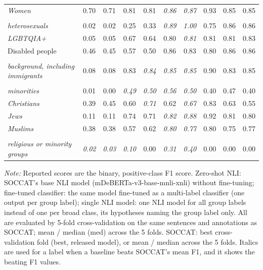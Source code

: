 \begin{table}[htb]
\begin{threeparttable}
\begin{tabular}{l c c c c c c c c c}
\textit{Women} & 0.70 & 0.71 & 0.81 & 0.81 & \textit{0.86} & \textit{0.87} & 0.93 & 0.85 & 0.85 \\
\shortstack[l]{\textit{Cisgender and}\\[-3pt]\textit{heterosexuals}} & 0.02 & 0.02 & 0.25 & 0.33 & \textit{0.89} & \textit{1.00} & 0.75 & 0.86 & 0.86 \\
\textit{LGBTQIA+} & 0.05 & 0.05 & 0.67 & 0.64 & 0.80 & \textit{0.81} & 0.81 & 0.81 & 0.83 \\
Disabled people & 0.46 & 0.45 & 0.57 & 0.50 & 0.86 & 0.83 & 0.80 & 0.86 & 0.86 \\
\shortstack[l]{\textit{People with an immigration}\\[-3pt]\textit{background, including immigrants}} & 0.08 & 0.08 & 0.83 & \textit{0.84} & \textit{0.85} & \textit{0.85} & 0.90 & 0.83 & 0.85 \\
\shortstack[l]{\textit{Ethnic and racial}\\[-3pt]\textit{minorities}} & 0.01 & 0.00 & \textit{0.49} & \textit{0.50} & \textit{0.56} & \textit{0.50} & 0.40 & 0.47 & 0.40 \\
\textit{Christians} & 0.39 & 0.45 & 0.60 & \textit{0.71} & 0.62 & \textit{0.67} & 0.83 & 0.63 & 0.55 \\
\textit{Jews} & 0.11 & 0.11 & 0.74 & 0.71 & \textit{0.82} & \textit{0.88} & 0.92 & 0.81 & 0.80 \\
\textit{Muslims} & 0.38 & 0.38 & 0.57 & 0.62 & \textit{0.80} & \textit{0.77} & 0.80 & 0.75 & 0.77 \\
\shortstack[l]{\textit{Multiple (or other)}\\[-3pt]\textit{religious or minority groups}} & \textit{0.02} & \textit{0.03} & \textit{0.10} & 0.00 & \textit{0.31} & \textit{0.40} & 0.00 & 0.00 & 0.00 \\
\bottomrule
\end{tabular}
\begin{tablenotes}[flushleft]
\footnotesize
\item \textit{Note:} Reported scores are the binary, positive-class F1 score. Zero-shot NLI: SOCCAT's base NLI model (mDeBERTa-v3-base-mnli-xnli) without fine-tuning; fine-tuned classifier: the same model fine-tuned as a multi-label classifier (one output per group label); single NLI model: one NLI model for all group labels instead of one per broad class, its hypotheses naming the group label only. All are evaluated by 5-fold cross-validation on the same sentences and annotations as SOCCAT; mean / median (med) across the 5 folds. SOCCAT: best cross-validation fold (best, released model), or mean / median across the 5 folds. Italics are used for a label when a baseline beats SOCCAT's mean F1, and it shows the beating F1 values.
\end{tablenotes}
\end{threeparttable}
\end{table}